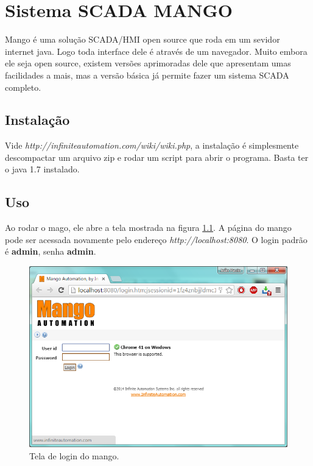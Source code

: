 \chapter{Sistema SCADA MANGO}
Mango é uma solução SCADA/HMI open source que roda em um sevidor internet java. Logo toda interface dele é através de um navegador. Muito embora ele seja open source, existem versões aprimoradas dele que apresentam umas facilidades a mais, mas a versão básica já permite fazer um sistema SCADA completo.

\section{Instalação}
Vide \emph{http://infiniteautomation.com/wiki/wiki.php}, a instalação é simplesmente descompactar um arquivo zip e rodar um script para abrir o programa. Basta ter o java 1.7 instalado.

\section{Uso}
Ao rodar o mago, ele abre a tela mostrada na figura \ref{fig:mango_login}. A página do mango pode ser acessada novamente pelo endereço \emph{http://localhost:8080}. O login padrão é \textbf{admin}, senha \textbf{admin}.
\begin{figure}[hbt]
	\begin{center}
		\includegraphics[width=\textwidth]{figuras/mango_login}
	\end{center}
	\caption{Tela de login do mango.}
	\label{fig:mango_login}
\end{figure}

